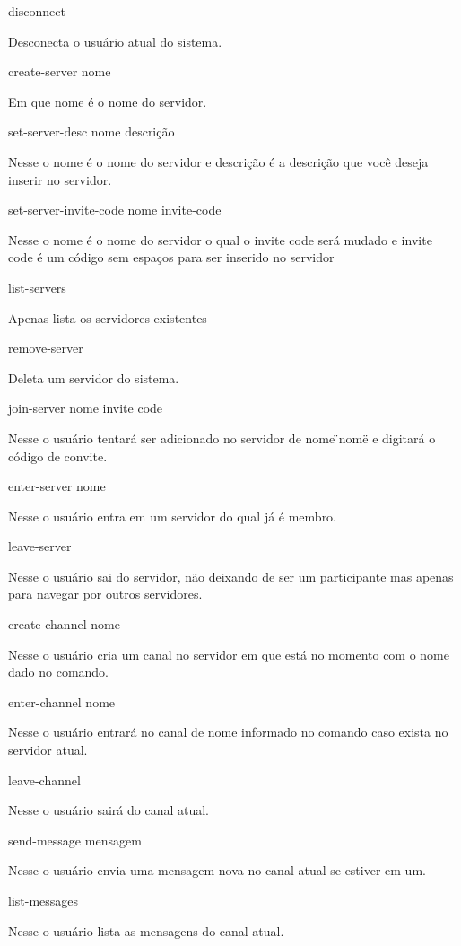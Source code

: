 \begin{DoxyItemize}
\item disconnect

Desconecta o usuário atual do sistema.
\item create-\/server nome

Em que nome é o nome do servidor.
\item set-\/server-\/desc nome descrição

Nesse o nome é o nome do servidor e descrição é a descrição que você deseja inserir no servidor.
\item set-\/server-\/invite-\/code nome invite-\/code

Nesse o nome é o nome do servidor o qual o invite code será mudado e invite code é um código sem espaços para ser inserido no servidor
\item list-\/servers

Apenas lista os servidores existentes
\item remove-\/server

Deleta um servidor do sistema.
\item join-\/server nome invite code

Nesse o usuário tentará ser adicionado no servidor de nome \"{}nome\"{} e digitará o código de convite.
\item enter-\/server nome

Nesse o usuário entra em um servidor do qual já é membro.
\item leave-\/server

Nesse o usuário sai do servidor, não deixando de ser um participante mas apenas para navegar por outros servidores.
\item create-\/channel nome

Nesse o usuário cria um canal no servidor em que está no momento com o nome dado no comando.
\item enter-\/channel nome

Nesse o usuário entrará no canal de nome informado no comando caso exista no servidor atual.
\item leave-\/channel

Nesse o usuário sairá do canal atual.
\item send-\/message mensagem

Nesse o usuário envia uma mensagem nova no canal atual se estiver em um.
\item list-\/messages

Nesse o usuário lista as mensagens do canal atual.
\end{DoxyItemize}